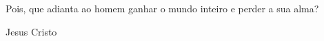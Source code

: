 \null %
\vfill
\epigraph{Pois, que adianta ao homem ganhar o mundo inteiro e perder a sua alma?}{Jesus Cristo}

